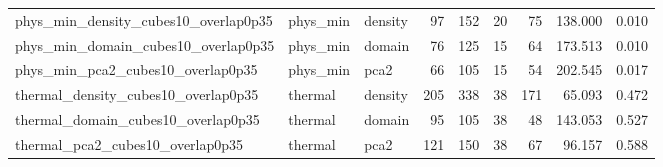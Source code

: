 \begin{table}[H]
\begin{adjustbox}{max width=\linewidth}
\begin{tabular}{lllrrrrrr}
phys\_min\_density\_cubes10\_overlap0p35 & phys\_min & density & 97 & 152 & 20 & 75 & 138.000 & 0.010 \\
phys\_min\_domain\_cubes10\_overlap0p35 & phys\_min & domain & 76 & 125 & 15 & 64 & 173.513 & 0.010 \\
phys\_min\_pca2\_cubes10\_overlap0p35 & phys\_min & pca2 & 66 & 105 & 15 & 54 & 202.545 & 0.017 \\
thermal\_density\_cubes10\_overlap0p35 & thermal & density & 205 & 338 & 38 & 171 & 65.093 & 0.472 \\
thermal\_domain\_cubes10\_overlap0p35 & thermal & domain & 95 & 105 & 38 & 48 & 143.053 & 0.527 \\
thermal\_pca2\_cubes10\_overlap0p35 & thermal & pca2 & 121 & 150 & 38 & 67 & 96.157 & 0.588 \\
\bottomrule
\end{tabular}
\end{adjustbox}

\end{table}
